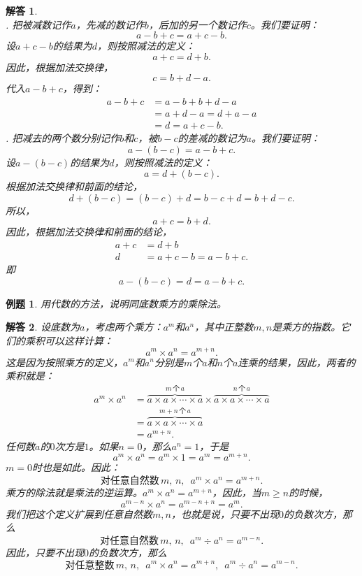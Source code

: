 \documentclass[12pt,UTF8]{ctexbook}
\newtheorem{et}{例题}[section]
\newtheorem*{so}{解答}
\begin{document}
\begin{so}
    \mbox{} \\
    . 把被减数记作$a$，先减的数记作$b$，后加的另一个数记作$c$。我们要证明：
    $$ a - b + c = a + c - b.$$
    设$a + c - b$的结果为$d$，则按照减法的定义：
    $$ a + c = d + b.$$
    因此，根据加法交换律，
    $$ c = b + d - a.$$
    代入$a - b + c$，得到：
    \begin{align*}
        a - b + c &= a - b + b + d - a \\
        &= a + d - a = d + a - a \tag{加法交换律} \\
        &= d = a + c - b.
    \end{align*}
    . 把减去的两个数分别记作$b$和$c$，被$b-c$的差减的数记为$a$。我们要证明：
    $$ a - (b - c) = a - b + c.$$
    设$a - (b - c)$的结果为$d$，则按照减法的定义：
    $$ a = d + (b - c).$$
    根据加法交换律和前面的结论，
    $$ d + (b - c) = (b - c) + d = b - c + d = b + d - c.$$
    所以，
    $$ a + c = b + d.$$
    因此，根据加法交换律和前面的结论，
    \begin{align*}
        a + c &= d + b \\
        d &= a + c - b = a - b + c.
    \end{align*}
    即
    $$ a - (b - c) = d = a - b + c.$$
\end{so}

\begin{et}
    用代数的方法，说明同底数乘方的乘除法。
\end{et}

\begin{so}
    设底数为$a$，考虑两个乘方：$a^m$和$a^n$，其中正整数$m,n$是乘方的指数。它们的乘积可以这样计算：
    $$ a^m \times a^n = a^{m+n}. $$
    这是因为按照乘方的定义，$a^m$和$a^n$分别是$m$个$a$和$n$个$a$连乘的结果，因此，两者的乘积就是：
    \begin{align*}
        a^m \times a^n &= \overbrace{a\times a\times \cdots \times a}^{m\,\text{个}\,a} \times \overbrace{a\times a\times \cdots \times a}^{n\,\text{个}\,a} \\
        &= \overbrace{a\times a\times \cdots \times a}^{m+n\,\text{个}\,a} \\
        &= a^{m+n}.
    \end{align*}
    任何数$a$的$0$次方是$1$。如果$n=0$，那么$a^n=1$，于是
    $$ a^m \times a^n = a^{m}\times 1 = a^m = a^{m+n}. $$
    $m=0$时也是如此。因此：
    $$ \mbox{对任意自然数}\,m,\, n, \,\,\, a^m \times a^n = a^{m+n}. $$
    乘方的除法就是乘法的逆运算。$ a^m \times a^n = a^{m+n}$，因此，当$m\geqslant n$的时候，
    $$ a^{m-n} \times a^n = a^{m-n+n} = a^m. $$
    我们把这个定义扩展到任意自然数$m,n$，也就是说，只要不出现$0$的负数次方，那么
    $$  \mbox{对任意自然数}\,m,\, n, \,\,\, a^m \div a^n = a^{m-n}. $$
    因此，只要不出现$0$的负数次方，那么
    $$  \mbox{对任意整数}\,m,\, n, \,\,\, a^m \times a^n = a^{m+n}, \,\,\, a^m \div a^n = a^{m-n}. $$
\end{so}
\end{document}
